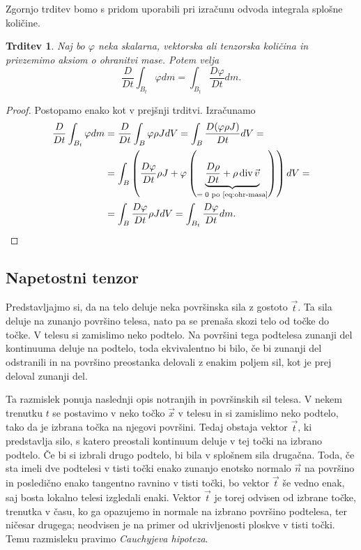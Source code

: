 \documentclass[12pt,a4paper,twoside]{article}
\theoremstyle{definition} %
\theoremstyle{plain} %
\newtheorem{trditev}[definicija]{Trditev}
\numberwithin{equation}{section}
\renewcommand{\div}{\operatorname{div}}
\renewcommand{\phi}{\varphi}
\newcommand{\DD}[2]{\ensuremath{\frac{D #1}{D #2}}}
\newcommand{\DDt}[1]{\DD{#1}{t}}
\newcommand{\vv}{\vec{v}}
\newcommand{\vt}{\vec{t}}
\newcommand{\vn}{\vec{n}}
\newcommand{\vx}{\vec{x}}
\begin{document}
Zgornjo trditev bomo s pridom uporabili pri izračunu odvoda integrala splošne
količine.
\begin{trditev}
  \label{trd:swap-der-int}
  Naj bo $\phi$ neka skalarna, vektorska ali tenzorska količina in privzemimo aksiom o ohranitvi
  mase. Potem velja
  \begin{equation}
    \DDt{} \int_{B_t}\phi dm = \int_{B_t} \DDt{\phi} dm.
    \label{eq:swap-der-int}
  \end{equation}
\end{trditev}
\begin{proof}
Postopamo enako kot v prejšnji trditvi. Izračunamo
\begin{align*}
    \DDt{} \int_{B_t}\phi dm &=
    \DDt{} \int_{B}\phi \rho J dV =
    \int_{B} \DDt{(\phi \rho J)} dV  = \\ &=
  \int_{B} \left(\DDt{\phi} \rho J + \phi \left(\underbrace{\DDt{\rho} + \rho
  \div \vv}_{=\;0 \text{ po \eqref{eq:ohr-masa}}} \right) \right)dV  = \\ &=
  \int_{B} \DDt{\phi} \rho JdV =
  \int_{B_t} \DDt{\phi} dm. \qedhere
\end{align*}
\end{proof}

\subsection{Napetostni tenzor}
Predstavljajmo si, da na telo deluje neka površinska sila z gostoto $\vt$. Ta sila deluje na zunanjo
površino telesa, nato pa se prenaša skozi telo od točke do točke. V telesu si zamislimo neko podtelo.
Na površini tega podtelesa zunanji del kontinuuma deluje na podtelo, toda ekvivalentno bi bilo, če
bi zunanji del odstranili in na površino preostanka delovali z enakim poljem sil, kot je prej
deloval zunanji del.

Ta razmislek ponuja naslednji opis notranjih in površinskih sil telesa. V nekem trenutku $t$
se postavimo v neko točko $\vx$ v telesu in si zamislimo neko podtelo, tako da je izbrana točka
na njegovi površini. Tedaj obstaja vektor $\vt$, ki predstavlja silo, s katero preostali kontinuum
deluje v tej točki na izbrano podtelo. Če bi si izbrali drugo podtelo, bi bila v splošnem sila
drugačna. Toda, če sta imeli dve podtelesi v tisti točki enako zunanjo enotsko normalo $\vn$ na
površino  in posledično enako tangentno ravnino v tisti točki, bo vektor $\vt$ še vedno enak, saj
bosta lokalno telesi izgledali enaki. Vektor $\vt$ je torej odvisen od izbrane točke, trenutka v
času, ko ga opazujemo in normale na izbrano površino podtelesa, ter ničesar drugega; neodvisen je na
primer od ukrivljenosti ploskve v tisti točki. Temu razmisleku pravimo \emph{Cauchyjeva hipoteza}.
\end{document}
